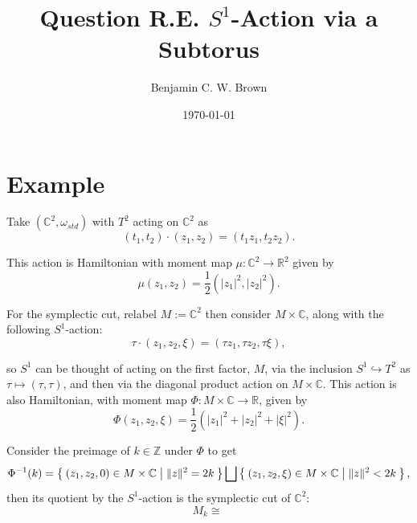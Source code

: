 \documentclass[11pt]{amsart}
\title{Question R.E. $S^{1}$-Action via a Subtorus}
\author{Benjamin C. W. Brown}
\date{\today}
\newcommand{\ra}{\rightarrow}
\newcommand{\w}{\omega}
\newcommand{\RR}{\mathbb{R}}
\newcommand{\CC}{\mathbb{C}}
\newcommand{\ZZ}{\mathbb{Z}}
\begin{document}
\maketitle
 
\section{Example}

Take $(\CC^{2}, \w_{std})$ with $T^{2}$ acting on $\CC^{2}$ as
\[
	(t_{1}, t_{2}) \cdot (z_{1}, z_{2}) = (t_{1}z_{1}, t_{2}z_{2}).
\]

This action is Hamiltonian with moment map $\mu : \CC^{2} \ra \RR^{2}$ given by
\[
	\mu(z_{1},z_{2}) = \frac{1}{2}\left(|z_{1}|^{2}, |z_{2}|^{2}\right).
\]

For the symplectic cut, relabel $M:= \CC^{2}$ then consider $M \times \CC$, along with the following $S^{1}$-action:
\[
	\tau \cdot (z_{1}, z_{2}, \xi) = (\tau z_{1}, \tau z_{2}, \tau \xi),
\]

so $S^{1}$ can be thought of acting on the first factor, $M$, via the inclusion $S^{1} \hookrightarrow T^{2}$ as $\tau \mapsto (\tau, \tau)$, and then via the diagonal product action on $M \times \CC$. This action is also Hamiltonian, with moment map $\Phi : M \times \CC \ra \RR$, given by
\[
	\Phi(z_{1}, z_{2}, \xi) = \frac{1}{2}\left(|z_{1}|^{2} + |z_{2}|^{2} + |\xi|^{2}\right).
\]

Consider the preimage of $k \in \ZZ$ under $\Phi$ to get
\[
	\Phi^{-1}(k) = \Set{(z_{1} , z_{2}, 0) \in M \times \CC | \|z\|^{2} = 2k} \bigsqcup \Set{ (z_{1}, z_{2}, \xi) \in M \times \CC | \|z\|^{2} < 2k },
\]
then its quotient by the $S^{1}$-action is the symplectic cut of $\CC^{2}$:
\[
	M_{k} \cong \
\]



\providecommand{\bysame}{\leavevmode\hbox to3em{\hrulefill}\thinspace}
\providecommand{\href}[2]{#2}



\end{document}
